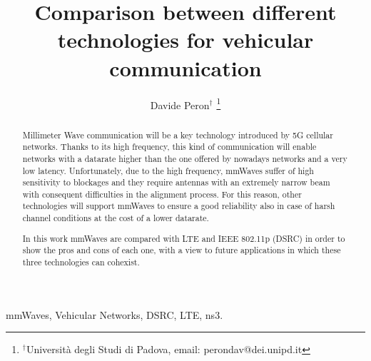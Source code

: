 \documentclass[10pt, conference, letterpaper]{IEEEtran}
\title{Comparison between different technologies for vehicular communication}
\author{Davide Peron$^\dag$
\thanks{$^\dag$Università degli Studi di Padova, email: perondav@dei.unipd.it}
}
\begin{document}
\maketitle

\begin{abstract}
Millimeter Wave communication will be a key technology introduced by 5G cellular networks. Thanks to its high frequency, this kind of communication will enable networks with a datarate higher than the one offered by nowadays networks and a very low latency. Unfortunately, due to the high frequency, mmWaves suffer of high sensitivity to blockages and they require antennas with an extremely narrow beam with consequent difficulties in the alignment process.
For this reason, other technologies will support mmWaves to ensure a good reliability also in case of harsh channel conditions at the cost of a lower datarate.

In this work mmWaves are compared with LTE and IEEE 802.11p (DSRC) in order to show the pros and cons of each one, with a view to future applications in which these three technologies can cohexist.
\end{abstract}

\IEEEkeywords
mmWaves, Vehicular Networks, DSRC, LTE, ns3.
\endIEEEkeywords














\end{document}
